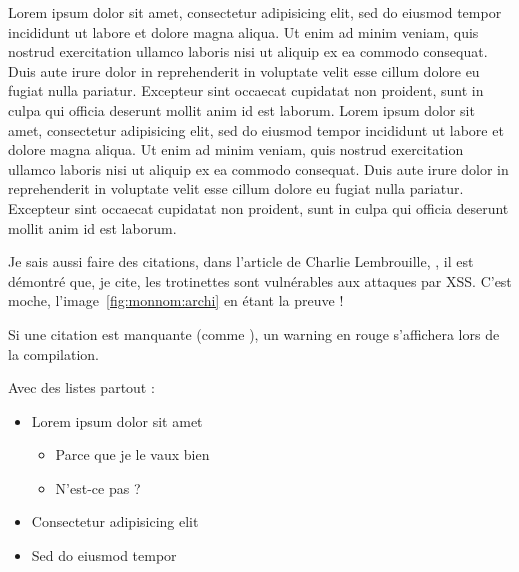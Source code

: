 Lorem ipsum dolor sit amet, consectetur adipisicing elit, sed do
eiusmod tempor incididunt ut labore et dolore magna aliqua. Ut enim ad
minim veniam, quis nostrud exercitation ullamco laboris nisi ut
aliquip ex ea commodo consequat. Duis aute irure dolor in
reprehenderit in voluptate velit esse cillum dolore eu fugiat nulla
pariatur. Excepteur sint occaecat cupidatat non proident, sunt in
culpa qui officia deserunt mollit anim id est laborum. Lorem ipsum
dolor sit amet, consectetur adipisicing elit, sed do eiusmod tempor
incididunt ut labore et dolore magna aliqua. Ut enim ad minim veniam,
quis nostrud exercitation ullamco laboris nisi ut aliquip ex ea
commodo consequat. Duis aute irure dolor in reprehenderit in voluptate
velit esse cillum dolore eu fugiat nulla pariatur. Excepteur sint
occaecat cupidatat non proident, sunt in culpa qui officia deserunt
mollit anim id est laborum.


Je sais aussi faire des citations, dans l'article de Charlie
Lembrouille, \cite{monnom:charlielembrouille}, il est démontré que, je cite,
\og{}les trotinettes sont vulnérables aux attaques par XSS\fg{}. C'est
moche, l'image~\ref{fig:monnom:archi} en étant la preuve !

Si une citation est manquante (comme \cite{monnom:referencefoireuse}),
un warning en rouge s'affichera lors de la compilation.

Avec des listes partout :

\begin{itemize}
\item Lorem ipsum dolor sit amet
  \begin{itemize}
  \item Parce que je le vaux bien
  \item N'est-ce pas ?
  \end{itemize}
\item Consectetur adipisicing elit
\item Sed do eiusmod tempor
\end{itemize}

